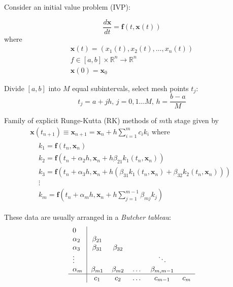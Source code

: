 \documentclass[10pt]{amsart}
\begin{document}
\begin{multicols*}{2}
Consider an initial value problem (IVP):

\begin{equation}
	\frac{d\mathbf{x}}{dt} = \mathbf{f}(t, \mathbf{x}(t)) 
\end{equation}
where
\[
\begin{gathered}
	\mathbf{x}(t) = (x_1(t), x_2(t), \dots, x_n(t)) \\
	f\in [a,b] \times \mathbb{R}^n \to \mathbb{R}^n \\
	\mathbf{x}(0) = \mathbf{x}_0
\end{gathered}
\]

Divide $[a,b]$ into $M$ equal subintervals, select mesh points $t_j$:
\[
t_j = a+ jh, \, j = 0, 1\dots M, \, h = \frac{b-a}{M}
\]

Family of explicit Runge-Kutta (RK) methods of $m$th stage given by
\begin{equation}\label{Eq:ERKmethodsMthStage}
\begin{gathered}
	\mathbf{x}(t_{n+1}) \equiv \mathbf{x}_{n+1} = \mathbf{x}_n + h \sum_{i=1}^m c_i k_i \text{ where } \\
	\begin{aligned}
		& k_1 = \mathbf{f}(t_n, \mathbf{x}_n) \\
		& k_2 = \mathbf{f}(t_n + \alpha_2 h, \mathbf{x}_n + h\beta_{21} k_1(t_n, \mathbf{x}_n)) \\
		& k_3 = \mathbf{f}(t_n + \alpha_3 h, \mathbf{x}_n + h( \beta_{31} k_1(t_n, \mathbf{x}_n) + \beta_{32} k_2(t_n, \mathbf{x}_n))) \\
		& \vdots \\
		& k_m = \mathbf{f}(t_n + \alpha_m h, \mathbf{x}_n + h \sum_{j=1}^{m-1} \beta_{mj}k_j)
	\end{aligned}
\end{gathered}
\end{equation}

These data are usually arranged in a \emph{Butcher tableau}:
\[
\begin{tabular}{ l|c c c c c }
	0 & & & & & \\
	$\alpha_2$ & $\beta_{21}$ &  & & & \\ 
	$\alpha_3$ & $\beta_{31}$ & $\beta_{32}$ & & & \\ 
	$\vdots$ &  & & & $\ddots$ & \\ 
	$\alpha_m$ & $\beta_{m1}$ & $\beta_{m2}$ & \dots & $\beta_{m, m-1}$ & \\
	\hline 
	& $c_1$ & $c_2$ & \dots & $c_{m-1}$ & $c_m$ \\
\end{tabular}
\]


\end{multicols*}
\end{document}
